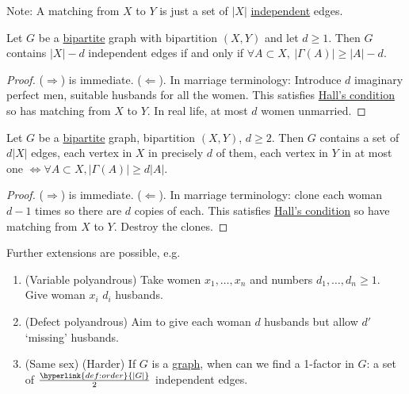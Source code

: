 \documentclass{article}
\begin{document}
Note: A matching from $X$ to $Y$ is just a set of $|X|$ \hyperlink{def:indepEdg}{independent} edges.
\begin{ncor}\label{cor:32}
    Let $G$ be a \hyperlink{def:bipartite}{bipartite} graph with bipartition $(X,Y)$ and let $d \geq 1$.
    Then $G$ contains $|X|-d$ independent edges if and only if $\forall A \subset X, \ |\Gamma(A)| \geq |A| - d$.
\end{ncor}
\begin{proof}
    ($\Rightarrow$) is immediate.
    ($\Leftarrow$). In marriage terminology: Introduce $d$ imaginary perfect men, suitable husbands for all the women.
    This satisfies \hyperlink{def:hall}{Hall's condition} so has matching from $X$ to $Y$.
    In real life, at most $d$ women unmarried.
\end{proof}
\begin{ncor}\label{cor:33}
    Let $G$ be a \hyperlink{def:bipartite}{bipartite} graph, bipartition $(X,Y)$, $d \geq 2$.
    Then $G$ contains a set of $d |X|$ edges, each vertex in $X$ in precisely $d$ of them, each vertex in $Y$ in at most one $\iff \forall A \subset X, |\Gamma(A)| \geq d |A|$.
\end{ncor}
\begin{proof}
    ($\Rightarrow$) is immediate.
    ($\Leftarrow$). In marriage terminology: clone each woman $d-1$ times so there are $d$ copies of each.
    This satisfies \hyperlink{def:hall}{Hall's condition} so have matching from $X$ to $Y$.
    Destroy the clones.
\end{proof}
Further extensions are possible, e.g.\
\begin{enumerate}[label=(\roman*)]
    \item (Variable polyandrous) Take women $x_1, \dotsc, x_n$ and numbers $d_1, \dotsc, d_n \geq 1$. Give woman $x_i$ $d_i$ husbands.
    \item (Defect polyandrous) Aim to give each woman $d$ husbands but allow $d'$ `missing' husbands.
    \item (Same sex) (Harder) If $G$ is a \hyperlink{def:graph}{graph}, when can we find a 1-factor in $G$: a set of $\frac{\hyperlink{def:order}{|G|}}{2}$ independent edges.
\end{enumerate}
\end{document}

